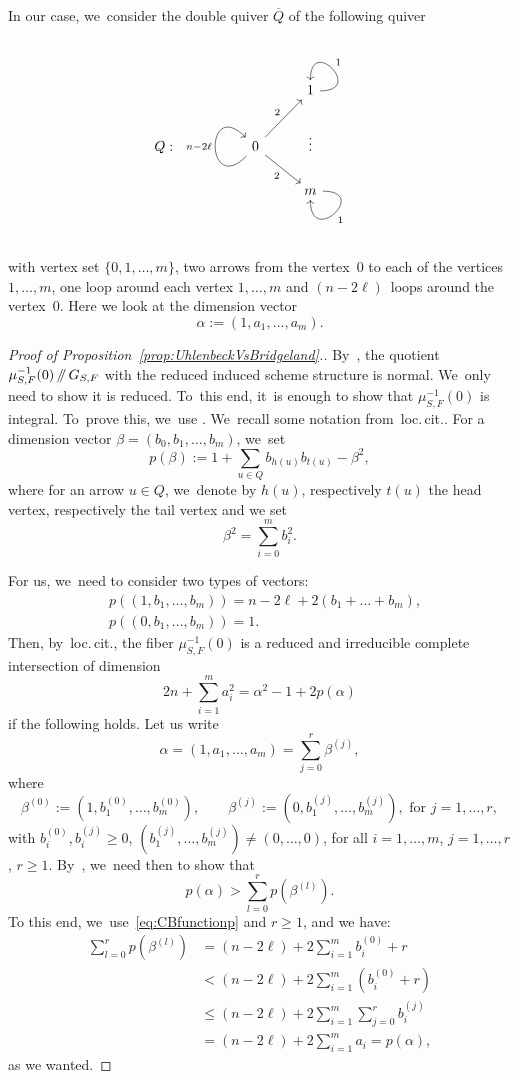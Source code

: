 \documentclass[11pt]{article}
\providecommand\sslash{\mathop{/\mkern-5.5mu/}}
\theoremstyle{definition}
\begin{document}
In our case, we~consider the double quiver $\overline{Q}$ of the following quiver
\[
\begin{tikzcd}
&&& 1 \arrow[out=0,in=90,loop,swap,"1"]\\
Q:&& 0 \arrow[out=-135,in=135,loop,"n-2\ell"]\arrow[ur,"2"]\arrow[dr,swap,"2"]&\vdots\\
&&& m \arrow[out=0,in=-90,loop,"1"]
\end{tikzcd}
\]
with vertex set $\{0,1,\dots,m\}$, two arrows from the vertex~0 to each of the vertices $1,\dots,m$, one loop around each vertex $1,\dots,m$ and $(n-2\ell)$~loops around the vertex~0.
Here we look at the dimension vector
\[
\alpha:=(1,a_1,\dots,a_m).
\]

\begin{proof}[Proof of Proposition~\ref{prop:UhlenbeckVsBridgeland}.]
By~\cite[Th.\,1.1]{CB:normality}, the quotient $\mu^{-1}_{S,F}(0)\sslash G_{S,F}$ with the reduced induced scheme structure is normal. We~only need to show it is reduced. To~this end, it~is enough to show that $\mu^{-1}_{S,F}(0)$ is integral. To~prove this, we~use \cite{CB:geometry}. We~recall some notation from~loc.\,cit..
For a dimension vector $\beta=(b_0,b_1,\dots,b_m)$, we~set
\[
p(\beta):=1+\sum_{u\in Q} b_{h(u)}b_{t(u)} - \beta^2,
\]
where for an arrow $u\in Q$, we~denote by $h(u)$, respectively $t(u)$ the head vertex, respectively the tail vertex and we set
\[
\beta^2=\sum_{i=0}^m b_i^2.
\]

For us, we~need to consider two types of vectors:
\begin{equation}\label{eq:CBfunctionp}
\begin{split}
&p((1,b_1,\dots,b_m))=n-2\ell + 2(b_1+\dots+b_m),\\
&p((0,b_1,\dots,b_m))=1.
\end{split}
\end{equation}
Then, by~loc.\,cit., the fiber $\mu^{-1}_{S,F}(0)$ is a reduced and irreducible complete intersection of dimension
\[
2n+\sum_{i=1}^ma_i^2=\alpha^2-1+2p(\alpha)
\]
if the following holds.
Let us write
\[
\alpha=(1,a_1,\dots,a_m)=\sum_{j=0}^r \beta^{(j)},
\]
where
\[
\beta^{(0)}:=(1,b_1^{(0)},\dots,b_m^{(0)}),\qquad \beta^{(j)}:=(0,b_1^{(j)},\dots,b_m^{(j)}),\text{ for }j=1,\dots,r,
\]
with $b_i^{(0)},b_i^{(j)}\geq0$, $(b_1^{(j)},\dots,b_m^{(j)})\neq(0,\dots,0)$, for all $i=1,\dots,m$, $j=1,\dots,r$, $r\geq 1$.
By~\cite[Th.\,1.2(2)]{CB:geometry}, we~need then to show that
\[
p(\alpha)>\sum_{l=0}^rp(\beta^{(l)}).
\]
To this end, we~use~\eqref{eq:CBfunctionp} and $r\geq1$, and we have:
\[
\begin{split}
\sum_{l=0}^rp(\beta^{(l)}) & = (n-2\ell)+2\sum_{i=1}^m b_i^{(0)} + r \\
& < (n-2\ell)+2\sum_{i=1}^m (b_i^{(0)} + r) \\
& \leq (n-2\ell)+2\sum_{i=1}^m \sum_{j=0}^r b_i^{(j)}\\
& = (n-2\ell)+2\sum_{i=1}^m a_i = p(\alpha),
\end{split}
\]
as we wanted.
\end{proof}
\end{document}

